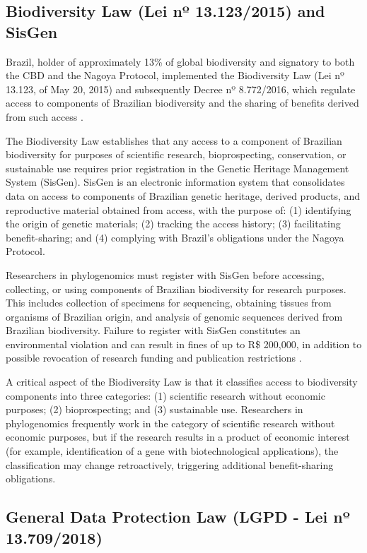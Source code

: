 \subsection{Biodiversity Law (Lei nº 13.123/2015) and SisGen}

Brazil, holder of approximately 13\% of global biodiversity and signatory to both the CBD and the Nagoya Protocol, implemented the Biodiversity Law (Lei nº 13.123, of May 20, 2015) and subsequently Decree nº 8.772/2016, which regulate access to components of Brazilian biodiversity and the sharing of benefits derived from such access \parencite{brasil2015, brasil2016}.

The Biodiversity Law establishes that any access to a component of Brazilian biodiversity for purposes of scientific research, bioprospecting, conservation, or sustainable use requires prior registration in the Genetic Heritage Management System (SisGen). SisGen is an electronic information system that consolidates data on access to components of Brazilian genetic heritage, derived products, and reproductive material obtained from access, with the purpose of: (1) identifying the origin of genetic materials; (2) tracking the access history; (3) facilitating benefit-sharing; and (4) complying with Brazil's obligations under the Nagoya Protocol.

Researchers in phylogenomics must register with SisGen before accessing, collecting, or using components of Brazilian biodiversity for research purposes. This includes collection of specimens for sequencing, obtaining tissues from organisms of Brazilian origin, and analysis of genomic sequences derived from Brazilian biodiversity. Failure to register with SisGen constitutes an environmental violation and can result in fines of up to R\$ 200,000, in addition to possible revocation of research funding and publication restrictions \parencite{brasil2015}.

A critical aspect of the Biodiversity Law is that it classifies access to biodiversity components into three categories: (1) scientific research without economic purposes; (2) bioprospecting; and (3) sustainable use. Researchers in phylogenomics frequently work in the category of scientific research without economic purposes, but if the research results in a product of economic interest (for example, identification of a gene with biotechnological applications), the classification may change retroactively, triggering additional benefit-sharing obligations.

\subsection{General Data Protection Law (LGPD - Lei nº 13.709/2018)}

